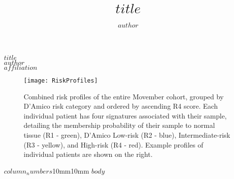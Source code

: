\documentclass[article,$base_font_size$,extrafontsizes]{memoir}
\author{$author$}
\title{$title$}
\begin{document}
\begin{mdframed}[style=brentsmdfstyle]

\renewcommand*\footnoterule{}
\renewcommand{\thempfootnote}{\footnotesize\color{footnotetextcol}{\arabic{mpfootnote}}}

\begingroup
  \centering
  \color{titletextcol}
\vspace{0.5in}
  \Huge{$title$}  \\[0.3in]
  \color{authortextcol} \normalsize{$author$} \\[0.2in]
  \color{affiliationtextcol} \footnotesize{$affiliation$}
  \vspace{0.2in}

  \endgroup
\end{mdframed}

\graphicspath{ {Figures/} }
\begin{figure}
  \centering
  \texttt{[image: RiskProfiles]}
  \vspace{-10mm}
  \captionsetup{width=.95\linewidth}
  \caption{Combined risk profiles of the entire Movember cohort, grouped by D’Amico risk category and ordered by ascending R4 score.
  Each individual patient has four signatures associated with their sample, detailing the membership probability of their sample to normal tissue (R1 - green), D’Amico Low-risk (R2 - blue), Intermediate-risk (R3 - yellow), and High-risk (R4 - red). Example profiles of individual patients are shown on the right.}
\end{figure}
\begin{adjmulticols*}{$column_numbers$}{10mm}{10mm}
\normalsize{
\color{bodytextcol}
$body$
}
\end{adjmulticols*}
\end{document}
